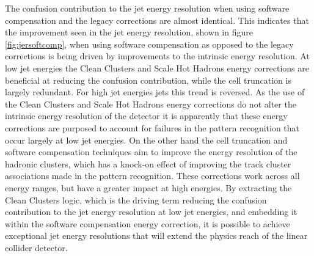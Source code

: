 The confusion contribution to the jet energy resolution when using software compensation and the legacy corrections are almost identical.  This indicates that the improvement seen in the jet energy resolution, shown in figure \ref{fig:jersoftcomp}, when using software compensation as opposed to the legacy corrections is being driven by improvements to the intrinsic energy resolution.  At low jet energies the Clean Clusters and Scale Hot Hadrons energy corrections are beneficial at reducing the confusion contribution, while the cell truncation is largely redundant.  For high jet energies jets this trend is reversed.  As the use of the Clean Clusters and Scale Hot Hadrons energy corrections do not alter the intrinsic energy resolution of the detector it is apparently that these energy corrections are purposed to account for failures in the pattern recognition that occur largely at low jet energies.  On the other hand the cell truncation and software compensation techniques aim to improve the energy resolution of the hadronic clusters, which has a knock-on effect of improving the track cluster associations made in the pattern recognition.  These corrections work across all energy ranges, but have a greater impact at high energies.  By extracting the Clean Clusters logic, which is the driving term reducing the confusion contribution to the jet energy resolution at low jet energies, and embedding it within the software compensation energy correction, it is possible to achieve exceptional jet energy resolutions that will extend the physics reach of the linear collider detector.  

